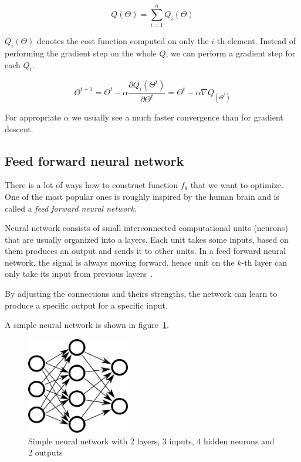     $$Q(\Theta) = \sum_{i=1}^n Q_i(\Theta)$$
    
    $Q_i(\Theta)$ denotes the cost function computed on only the $i$-th element. 
    Instead of performing the gradient step on the whole $Q$, 
    we can perform a gradient step for each $Q_i$. 

    \begin{equation}
    \Theta^{t+1} = \Theta^t - \alpha \frac{\partial Q_i(\Theta^t)}{\partial \Theta^t} = \Theta^t - \alpha \nabla Q_(\Theta^t)
    \label{eq:stochastic:gradient:descent}
    \end{equation}
    
    For appropriate $\alpha$ we usually see a much faster convergence than for gradient descent.
    
    \subsection{Feed forward neural network}
    There is a lot of ways how to construct function $f_\theta$ that we want to optimize. 
    One of the most popular ones is roughly inspired by the human brain and is called a \textit{feed forward neural network}.
    
    Neural network consists of small interconnected computational units (neurons) that are usually organized into a layers.
    Each unit takes some inputs, based on them produces an output and sends it to other units. 
    In a feed forward neural network, the signal is always moving forward,
    hence unit on the $k$-th layer can only take its input from previous layers~\cite{Goodfellow-et-al-2016}.
    
    By adjusting the connections and theirs strengths, the network can learn to produce a specific output for a specific input.
    
    A simple neural network is shown in figure~\ref{obr:siet}.
    
    \begin{figure}[h]
    \centerline{\includegraphics[width=0.4\textwidth]{images/neural_network}}
    \caption[Simple neural network with 2 layers, 3 inputs, 4 neurons and 2 outputs]{Simple neural network with 2 layers, 3 inputs, 4 hidden neurons and 2 outputs}
    \label{obr:siet}
    \end{figure}
    
